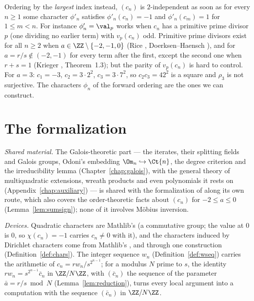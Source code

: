 \begin{remark}
  \label{rem:ppd}
  Ordering by the \emph{largest} index instead, $(c_n)$ is $2$-independent as soon as for every
  $n \ge 1$ some character $\phi'_n$ satisfies $\phi'_n(c_n) = -1$ and $\phi'_n(c_m) = 1$ for
  $1 \le m < n$. For instance $\phi'_n = \val_p$ works when $c_n$ has a primitive prime
  divisor $p$ (one dividing no earlier term) with $v_p(c_n)$ odd. Primitive prime divisors exist
  for all $n \ge 2$ when $a \in \ZZ \setminus \{-2, -1, 0\}$ (Rice \cite{rice},
  Doerksen--Haensch \cite{doerksen-haensch}), and for $a = r/s \notin (-2, -1)$ for every term
  after the first, except the second one when $r + s = 1$ (Krieger \cite{krieger}, Theorem~1.3);
  but the parity of $v_p(c_n)$ is hard to control. For $a = 3$: $c_1 = -3$,
  $c_2 = 3 \cdot 2^2$, $c_3 = 3 \cdot 7^2$, so $c_2 c_3 = 42^2$ is a square and $\rho_3$ is not
  surjective. The characters $\phi_n$ of the forward ordering are the ones we can construct.
\end{remark}

\section{The formalization}
\label{sec:formalization}

\emph{Shared material.} The Galois-theoretic part --- the iterates, their splitting fields and
Galois groups, Odoni's embedding $\Om_n \hookrightarrow \Ct{n}$, the degree criterion and
the irreducibility lemma (Chapter~\ref{chap:galois}), with the general theory of
multiquadratic extensions, wreath products and even polynomials it rests on
(Appendix~\ref{chap:auxiliary}) --- is shared with the formalization of \cite{paper} along its
own route, which also covers the order-theoretic facts about $(c_n)$ for $-2 \le a \le 0$
(Lemma~\ref{lem:sumsign}); none of it involves Möbius inversion.

\emph{Devices.} Quadratic characters are Mathlib's  (a commutative group;
the value at $0$ is $0$, so $\chi(c_n) = -1$ carries $c_n \ne 0$ with it), and the characters
induced by Dirichlet characters come from Mathlib's ,
 and  through one construction (Definition~\ref{def:chars}).
The integer sequence $w_n$ (Definition~\ref{def:wseq}) carries the arithmetic of $c_n = r w_n/s^{2^{n-1}}$;
for a modulus $N$ prime to $s$, the identity $r w_n = s^{2^{n-1}} \bar c_n$ in $\ZZ/N\ZZ$, with
$(\bar c_n)$ the sequence of the parameter $\bar a = r/s \bmod N$ (Lemma~\ref{lem:reduction}),
turns every local argument into a computation with the sequence $(\bar c_n)$ in $\ZZ/N\ZZ$.

